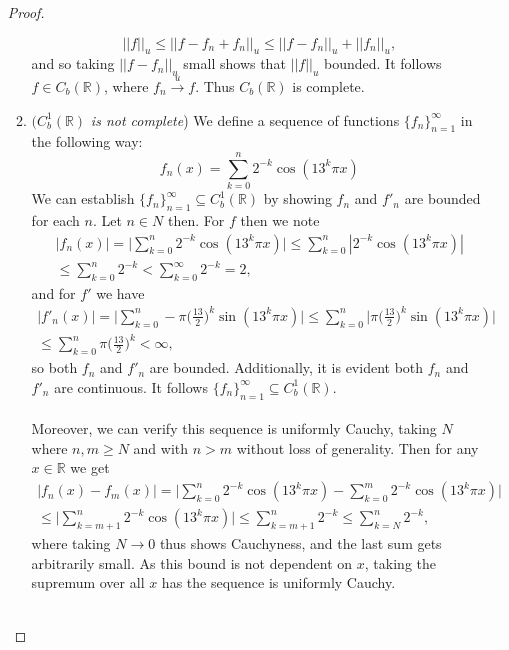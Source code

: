 \documentclass[12pt]{article}
\newenvironment{ex}[2][Exercise]{\begin{trivlist}
\item[\hskip \labelsep {\bfseries #1}\hskip \labelsep {\bfseries #2.}]}{\end{trivlist}}
\begin{document}
\begin{ex}{3}
\begin{enumerate}[label=(\alph*)]
\begin{proof}
\begin{enumerate}[label=(\roman*)]
            $$||f||_u \leq ||f - f_n + f_n||_u \leq ||f - f_n||_u + ||f_n||_u,$$
            and so taking $||f - f_n||_u$ small shows that $||f||_u$ bounded. It follows $f \in C_b(\mathbb{R})$, where $f_n \xrightarrow{u} f$. Thus $C_b(\mathbb{R})$ is complete.
            \item $(C_b^1(\mathbb{R})$\textit{ is not complete}) We define a sequence of functions $\{f_n\}_{n = 1}^\infty$ in the following way:
            $$f_n(x) = \sum_{k = 0}^n 2^{-k}\cos(13^k \pi x)$$
            We can establish $\{f_n\}_{n = 1}^\infty \subseteq{C_b^1(\mathbb{R})}$ by showing $f_n$ and $f'_n$ are bounded for each $n$. Let $n \in N$ then. For $f$ then we note 
            \begin{align*}
            |f_n(x)| = \Big | \sum_{k = 0}^n 2^{-k}\cos(13^k \pi x) \Big | \leq \sum_{k = 0}^n |2^{-k}\cos(13^k \pi x)| \\
            \leq \sum_{k = 0}^n 2^{-k} < \sum_{k = 0}^\infty 2^{-k} = 2,
            \end{align*}
            and for $f'$ we have 
            \begin{align*}
                |f'_n(x)| = \Big | \sum_{k = 0}^n -\pi \Big (\frac{13}{2} \Big)^k \sin(13^k \pi x) \Big | \leq \sum_{k = 0}^n \Big | \pi \Big (\frac{13}{2} \Big)^k \sin(13^k \pi x) \Big | \\
                \leq \sum_{k = 0}^n \pi \Big (\frac{13}{2} \Big)^k < \infty,
            \end{align*}
            so both $f_n$ and $f'_n$ are bounded. Additionally, it is evident both $f_n$ and $f'_n$ are continuous. It follows $\{f_n\}_{n = 1}^\infty \subseteq C_b^1(\mathbb{R})$. \\ \\
            Moreover, we can verify this sequence is uniformly Cauchy, taking $N$ where $n, m \geq N$ and with $n > m$ without loss of generality. Then for any $x \in \mathbb{R}$ we get
            \begin{align*}
                |f_n(x) - f_m(x)| = \Big | \sum_{k = 0}^n 2^{-k}\cos(13^k \pi x) - \sum_{k = 0}^m 2^{-k}\cos(13^k \pi x) \Big | \\
                \leq \Big | \sum_{k = m + 1}^n 2^{-k}\cos(13^k \pi x) \Big | \leq \sum_{k = m + 1}^n 2^{-k} \leq \sum_{k = N}^n 2^{-k},
            \end{align*}
            where taking $N \rightarrow 0$ thus shows Cauchyness, and the last sum gets arbitrarily small. As this bound is not dependent on $x$, taking the supremum over all $x$ has the sequence is uniformly Cauchy. \\ \\

\end{enumerate}
\end{proof}
\end{enumerate}
\end{ex}
\end{document}
